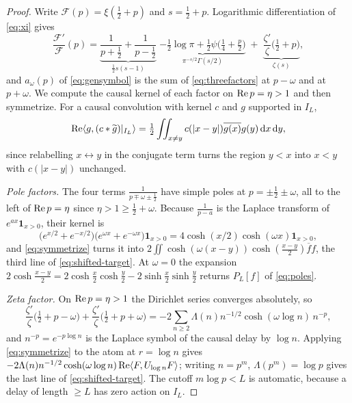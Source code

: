 \begin{proof}
Write $\mathcal F(p)=\xi(\frac12+p)$ and $s=\frac12+p$. Logarithmic
differentiation of \eqref{eq:xi} gives
\begin{equation}\label{eq:threefactors}
 \frac{\mathcal F'}{\mathcal F}(p)
 =\underbrace{\frac1{p+\frac12}+\frac1{p-\frac12}}_{\frac12s(s-1)}
 \;\underbrace{-\tfrac12\log\pi+\tfrac12\psi\big(\tfrac14+\tfrac p2\big)}
   _{\pi^{-s/2}\Gamma(s/2)}
 \;+\;\underbrace{\frac{\zeta'}{\zeta}\big(\tfrac12+p\big)}_{\zeta(s)},
\end{equation}
and $a_\omega(p)$ of \eqref{eq:gensymbol} is the sum of \eqref{eq:threefactors}
at $p-\omega$ and at $p+\omega$. We compute the causal kernel of each factor on
$\operatorname{Re} p=\eta>1$ and then symmetrize. For a causal convolution with kernel $c$ and
$g$ supported in $I_L$,
\begin{equation}\label{eq:symmetrize}
 \operatorname{Re}\langle g,(c*\widetilde g)|_{I_L}\rangle
 =\tfrac12\iint_{x\neq y}c(|x-y|)\overline{g(x)}g(y)\,\mathrm d x\,\mathrm d y ,
\end{equation}
since relabelling $x\leftrightarrow y$ in the conjugate term turns the region
$y<x$ into $x<y$ with $c(|x-y|)$ unchanged.

\emph{Pole factors.} The four terms $\frac1{p\mp\omega\pm\frac12}$ have simple
poles at $p=\pm\frac12\pm\omega$, all to the left of $\operatorname{Re} p=\eta$ since
$\eta>1\geq\frac12+\omega$. Because $\frac1{p-a}$ is the Laplace transform of
$e^{ax}\mathbf1_{x>0}$, their kernel is
\[
 \big(e^{x/2}+e^{-x/2}\big)\big(e^{\omega x}+e^{-\omega x}\big)\mathbf1_{x>0}
 =4\cosh(x/2)\cosh(\omega x)\mathbf1_{x>0},
\]
and \eqref{eq:symmetrize} turns it into
$2\iint\cosh(\omega(x-y))\cosh(\frac{x-y}2)\overline f f$, the third line of
\eqref{eq:shifted-target}. At $\omega=0$ the expansion
$2\cosh\frac{x-y}2=2\cosh\frac x2\cosh\frac y2-2\sinh\frac x2\sinh\frac y2$
returns $P_L[f]$ of \eqref{eq:poles}.

\emph{Zeta factor.} On $\operatorname{Re} p=\eta>1$ the Dirichlet series converges absolutely,
so
\[
 \frac{\zeta'}{\zeta}\big(\tfrac12+p-\omega\big)
 +\frac{\zeta'}{\zeta}\big(\tfrac12+p+\omega\big)
 =-2\sum_{n\geq2}\Lambda(n)n^{-1/2}\cosh(\omega\log n)\,n^{-p},
\]
and $n^{-p}=e^{-p\log n}$ is the Laplace symbol of the causal delay by $\log n$.
Applying \eqref{eq:symmetrize} to the atom at $r=\log n$ gives
$-2\Lambda(n)n^{-1/2}\cosh(\omega\log n)\operatorname{Re}\langle F,U_{\log n}F\rangle$; writing
$n=p^m$, $\Lambda(p^m)=\log p$ gives the last line of
\eqref{eq:shifted-target}. The cutoff $m\log p<L$ is automatic, because a delay
of length $\geq L$ has zero action on $I_L$.


\end{proof}
